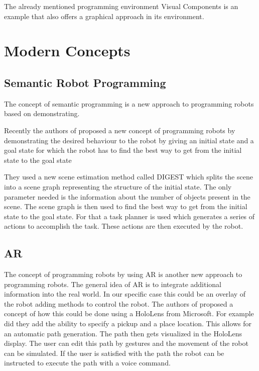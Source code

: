 \documentclass[conference]{IEEEtran}
\begin{document}
        The already mentioned programming environment Visual Components is an example that also offers a graphical approach in its environment. \cite{i5}

\section{Modern Concepts}

    \subsection{Semantic Robot Programming}

        The concept of semantic programming is a new approach to programming robots based on demonstrating.

        Recently the authors of \cite{p1} proposed a new concept of programming robots by demonstrating the desired behaviour to the robot by giving an initial state and a goal state for which the robot has to find the best way to get from the initial state to the goal state

        They used a new scene estimation method called DIGEST which splits the scene into a scene graph representing the structure of the initial state. The only parameter needed is the information about the number of objects present in the scene. The scene graph is then used to find the best way to get from the initial state to the goal state.
        For that a task planner is used which generates a series of actions to accomplish the task. These actions are then executed by the robot.
        \cite[p. 2]{p1}

    \subsection{AR}
    
        The concept of programming robots by using AR is another new approach to programming robots.
        The general idea of AR is to integrate additional information into the real world. In our specific case this could be an overlay of the robot adding methods to control the robot.
        The authors of \cite{p3} proposed a concept of how this could be done using a HoloLens from Microsoft.
        For example did they add the ability to specify a pickup and a place location. This allows for an automatic path generation. The path then gets visualized in the HoloLens display. The user can edit this path by gestures and the movement of the robot can be simulated.
        If the user is satisfied with the path the robot can be instructed to execute the path with a voice command.
        \cite[p. 2]{p3}
\end{document}
